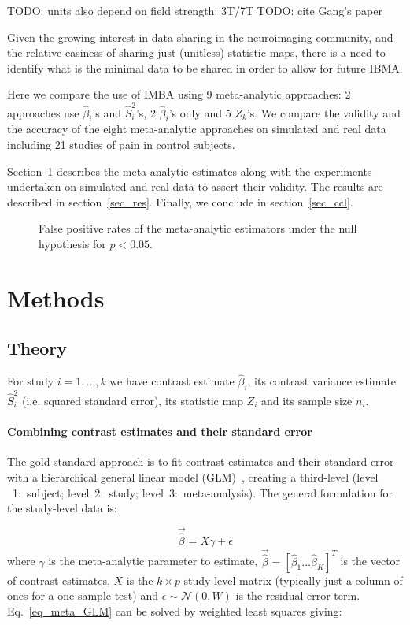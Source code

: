 \documentclass[preprint,12pt]{elsarticle}
\newcommand{\effectvector}{\hat\beta}
\newcommand{\effect}[1][i]{\effectvector_{#1}}
\newcommand{\vareffect}[1][i]{\hat S^2_{#1}}
\newcommand{\zeffect}[1][\studyidx]{Z_{#1}}
\newcommand{\nStudies}{K}
\newcommand{\studyidx}{k}
\newcommand{\metaanalyticeffect}{\gamma}
\newcommand{\transpose}{^T}
\begin{document}
TODO: units also depend on field strength: 3T/7T
TODO: cite Gang's paper

Given the growing interest in data sharing in the neuroimaging community, and the relative easiness of sharing just (unitless) statistic maps, there is a need to identify what is the minimal data to be shared in order to allow for future IBMA.

Here we compare the use of IMBA using 9 meta-analytic approaches: 2 approaches use $\effect$'s and $\vareffect$'s, 2 $\effect$'s only and 5 $\zeffect$'s. We compare the validity and the accuracy of the eight meta-analytic approaches on simulated and real data including 21 studies of pain in control subjects.

Section~\ref{sec_meth} describes the meta-analytic estimates along with the experiments undertaken on simulated and real data to assert their validity. The results are described in section~\ref{sec_res}. Finally, we conclude in section~\ref{sec_ccl}.

\begin{figure}[t]
	\centering
	\caption{False positive rates of the meta-analytic estimators under the null hypothesis for $p<0.05$.}
	\label{fig_fpr_all}
\end{figure}

\section{Methods}\label{sec_meth}
\subsection{Theory}
For study $i=1,\ldots,k$ we have contrast estimate $\effect$, its contrast variance estimate $\vareffect$ (i.e. squared standard error), its statistic map $Z_i$ and its sample size $n_i$.  

\paragraph{Combining contrast estimates and their standard error}

The gold standard approach is to fit contrast estimates and their standard error with a hierarchical general linear model (GLM)~\cite{Cummings2004}, creating a third-level (level ~1:~subject; level~2:~study; level~3:~meta-analysis). The general formulation for the study-level data is:

\begin{equation}
	\vec{\effectvector} = X \metaanalyticeffect + \epsilon
	\label{eq_meta_GLM}
\end{equation}
where $\metaanalyticeffect$ is the meta-analytic parameter to estimate, $\vec{\effectvector} = [\effect[1] \ldots \effect[\nStudies] ]\transpose$ is the vector of contrast estimates, $X$ is the $k\times p$ study-level matrix (typically just a column of ones for a one-sample test) and $\epsilon \sim \mathcal{N}(0,W)$ is the residual error term. Eq.~\eqref{eq_meta_GLM} can be solved by weighted least squares giving:
\end{document}
